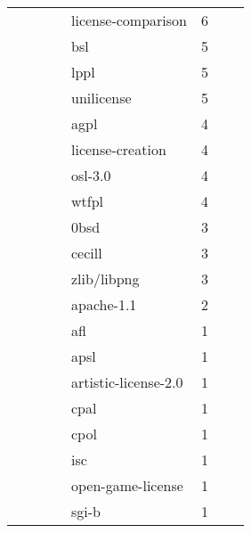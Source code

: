 \begin{table}
\begin{adjustbox}{width=0.9\textwidth}
\begin{tabular}{lclclclc}
&&&&license-comparison&	6\\
&&&&bsl&	5\\
&&&&lppl&	5\\
&&&&unilicense&	5\\
&&&&agpl&	4\\
&&&&license-creation&	4\\
&&&&osl-3.0&	4\\
&&&&wtfpl&	4\\
&&&&0bsd&	3\\
&&&&cecill&	3\\
&&&&zlib/libpng	&3\\
&&&&apache-1.1&	2\\
&&&&afl	&1\\
&&&&apsl&	1\\
&&&&artistic-license-2.0&	1\\
&&&&cpal&	1\\
&&&&cpol&	1\\
&&&&isc	&1\\
&&&&open-game-license&	1\\
&&&&sgi-b&	1\\
\hline
\end{tabular}
\end{adjustbox}
\end{table}